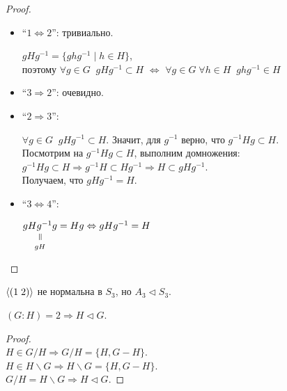 \begin{proof} $ $

    \begin{itemize}
        \item ``$1 \Leftrightarrow 2$'': тривиально.
        
        $gHg^{-1} = \{ghg^{-1} \mid h \in H\}$, \\
        поэтому
        $\forall g \in G \;\; gHg^{-1} \subset H$
        $\Longleftrightarrow $
        $\forall g \in G \; \forall h \in H \;\;
        ghg^{-1} \in H$

        \item ``$3 \Rightarrow 2$'': очевидно.
        
        \item ``$2 \Rightarrow 3$'':
        
        $\forall g \in G \;\; gHg^{-1} \subset H$.
        Значит, для $g^{-1}$ верно, что $g^{-1}Hg \subset H$. \\
        Посмотрим на $g^{-1}Hg \subset H$, выполним домножения: \\
        $g^{-1}Hg \subset H \Rightarrow g^{-1}H \subset Hg^{-1}
        \Rightarrow H \subset gHg^{-1}$. \\
        Получаем, что $gHg^{-1} = H$.

        \item ``$3 \Leftrightarrow 4$'':
        
        $\equalto{gHg^{-1}g}{gH} = Hg \Leftrightarrow gHg^{-1} = H$
    \end{itemize}
\end{proof}

\begin{example}
    $\langle (1 \; 2) \rangle$ не нормальна в $S_3$, но $A_3 \lhd S_3$.
\end{example}

\notice $(G : H) = 2 \Rightarrow H \lhd G$.
\begin{proof} $ $\\
    $H \in G/H \Rightarrow G/H = \{H, G - H\}$.\\
    $H \in H\backslash G \Rightarrow 
    H\backslash G = \{H, G - H\}$.\\
    $G/H = H\backslash G \Rightarrow H \lhd G$.
\end{proof}